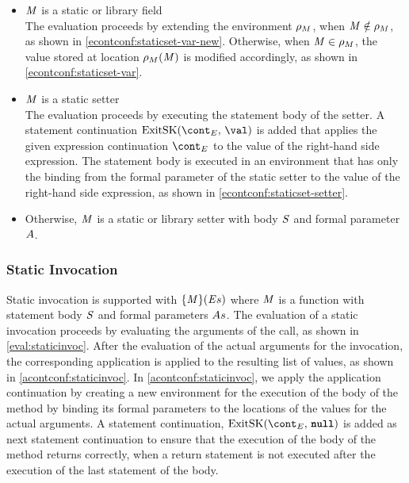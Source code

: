\documentclass[a4paper,oneside,fleqn]{article}
\newcommand{\synt}[1]{\ensuremath{\text{\textbf{\texttt{#1}}}}}
\DeclareMathOperator{\nnull}{\synt{null}}
\begin{document}
\begin{itemize}
    \item $\mathit{M}$ is a static or library field\\
        The evaluation proceeds by extending the environment $\rho_{M}$, when $\mathit{M} \notin \rho_{M}$, as shown in \eqref{econtconf:staticset-var-new}.
        Otherwise, when $\mathit{M} \in \rho_{M}$, the value stored at location $\rho_{M}(\mathit{M})$ is modified accordingly, as shown in \eqref{econtconf:staticset-var}.

    \item $\mathit{M}$ is a static setter\\
        The evaluation proceeds by executing the statement body of the setter. A statement continuation $\ExitSK{\val}$ is added that applies the given expression continuation $\econt$ to the value of the right-hand side expression.
        The statement body is executed in an environment that has only the binding from the formal parameter of the static setter to the value of the right-hand side expression, as shown in \eqref{econtconf:staticset-setter}.

    \item Otherwise, $\mathit{M}$ is a static or library setter with body $\mathit{S}$ and formal parameter $A$.

\end{itemize}


\subsubsection{Static Invocation}
\label{subsubsec:static-invoc}

Static invocation is supported with $\{\mathit{M}\}(\mathit{E}{s})$ where $\mathit{M}$ is a function with statement body $\mathit{S}$ and formal parameters $As$.
The evaluation of a static invocation proceeds by evaluating the arguments of the call, as shown in \eqref{eval:staticinvoc}.
After the evaluation of the actual arguments for the invocation, the corresponding application is applied to the resulting list of values, as shown in \eqref{acontconf:staticinvoc}.
In \eqref{acontconf:staticinvoc}, we apply the application continuation by creating a new environment for the execution of the body of the method by binding its formal parameters to the locations of the values for the actual arguments.
A statement continuation, $\ExitSK{\nnull}$ is added as next statement continuation to ensure that the execution of the body of the method returns correctly, when a return statement is not executed after the execution of the last statement of the body.
\end{document}
